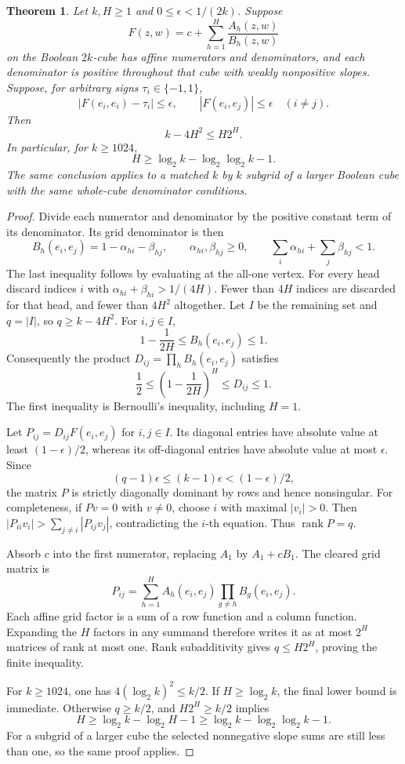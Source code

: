 \documentclass[11pt]{article}
\newtheorem{theorem}{Theorem}
\begin{document}
\begin{theorem}
Let $k,H\geq1$ and $0\leq\epsilon<1/(2k)$. Suppose
\[
 F(z,w)=c+\sum_{h=1}^H\frac{A_h(z,w)}{B_h(z,w)}
\]
on the Boolean $2k$-cube has affine numerators and denominators, and
each denominator is positive throughout that cube with weakly
nonpositive slopes. Suppose, for arbitrary signs $\tau_i\in\{-1,1\}$,
\[
 |F(e_i,e_i)-\tau_i|\leq\epsilon,\qquad
 |F(e_i,e_j)|\leq\epsilon\quad(i\neq j).
\]
Then
\[
 k-4H^2\leq H2^H.
\]
In particular, for $k\geq1024$,
\[
 H\geq\log_2k-\log_2\log_2k-1.
\]
The same conclusion applies to a matched $k$ by $k$ subgrid of a
larger Boolean cube with the same whole-cube denominator conditions.
\end{theorem}
\begin{proof}
Divide each numerator and denominator by the positive constant term
of its denominator. Its grid denominator is then
\[
 B_h(e_i,e_j)=1-\alpha_{hi}-\beta_{hj},\qquad
 \alpha_{hi},\beta_{hj}\geq0,\qquad
 \sum_i\alpha_{hi}+\sum_j\beta_{hj}<1.
\]
The last inequality follows by evaluating at the all-one vertex.
For every head discard indices $i$ with
$\alpha_{hi}+\beta_{hi}>1/(4H)$. Fewer than $4H$ indices are
discarded for that head, and fewer than $4H^2$ altogether. Let $I$
be the remaining set and $q=|I|$, so $q\geq k-4H^2$.
For $i,j\in I$,
\[
 1-\frac1{2H}\leq B_h(e_i,e_j)\leq1.
\]
Consequently the product $D_{ij}=\prod_h B_h(e_i,e_j)$ satisfies
\[
 \frac12\leq\left(1-\frac1{2H}\right)^H
                    \leq D_{ij}\leq1.
\]
The first inequality is Bernoulli's inequality, including $H=1$.

Let $P_{ij}=D_{ij}F(e_i,e_j)$ for $i,j\in I$.
Its diagonal entries have absolute value at least
$(1-\epsilon)/2$, whereas its off-diagonal entries have absolute
value at most $\epsilon$. Since
\[
 (q-1)\epsilon\leq(k-1)\epsilon<(1-\epsilon)/2,
\]
the matrix $P$ is strictly diagonally dominant by rows and hence
nonsingular. For completeness, if $Pv=0$ with $v\neq0$, choose
$i$ with maximal $|v_i|>0$. Then
$|P_{ii}v_i|>\sum_{j\neq i}|P_{ij}v_j|$, contradicting the
$i$-th equation. Thus $\operatorname{rank}P=q$.

Absorb $c$ into the first numerator, replacing $A_1$ by
$A_1+cB_1$. The cleared grid matrix is
\[
 P_{ij}=\sum_{h=1}^H A_h(e_i,e_j)
                     \prod_{g\neq h}B_g(e_i,e_j).
\]
Each affine grid factor is a sum of a row function and a column
function. Expanding the $H$ factors in any summand therefore writes
it as at most $2^H$ matrices of rank at most one. Rank subadditivity
gives $q\leq H2^H$, proving the finite inequality.

For $k\geq1024$, one has $4(\log_2k)^2\leq k/2$.
If $H\geq\log_2k$, the final lower bound is immediate.
Otherwise $q\geq k/2$, and $H2^H\geq k/2$ implies
\[
 H\geq\log_2k-\log_2H-1
   \geq\log_2k-\log_2\log_2k-1.
\]
For a subgrid of a larger cube the selected nonnegative slope sums
are still less than one, so the same proof applies.
\end{proof}
\end{document}
